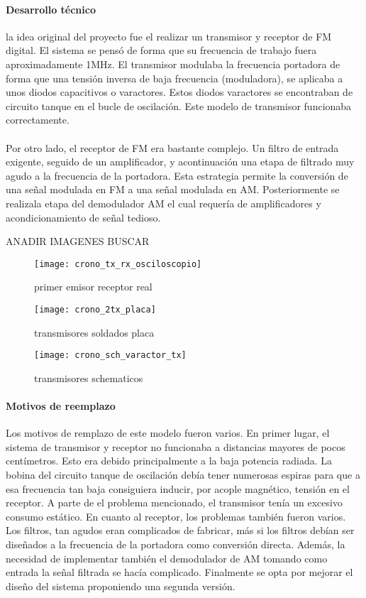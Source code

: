 \paragraph{Desarrollo técnico}
la idea original del proyecto fue el realizar un transmisor y receptor de FM digital. El sistema se pensó de forma que su frecuencia de trabajo fuera aproximadamente 1MHz. 
El transmisor modulaba la frecuencia portadora de forma que una tensión inversa de baja frecuencia (moduladora), se aplicaba a unos diodos capacitivos o varactores. Estos diodos varactores se encontraban de circuito tanque en el bucle de oscilación.
Este modelo de transmisor funcionaba correctamente.

\paragraph{}
Por otro lado, el receptor de FM era bastante complejo. Un filtro de entrada exigente, seguido de un amplificador, y acontinuación una etapa de filtrado muy agudo a la frecuencia de la portadora. Esta estrategia permite la conversión de una señal modulada en FM a una señal modulada en AM. Posteriormente se realizala etapa del demodulador AM el cual requería de amplificadores y acondicionamiento de señal tedioso.  

ANADIR IMAGENES BUSCAR
\begin{figure}[h]
    \centering
    \texttt{[image: crono\_tx\_rx\_osciloscopio]}
    \caption{primer emisor receptor real}
    \label{fig:simrx_zoom}
\end{figure}

\begin{figure}[h]
    \centering
    \texttt{[image: crono\_2tx\_placa]}
    \caption{transmisores soldados placa}
    \label{fig:simrx_zoom}
\end{figure}

\begin{figure}[h]
    \centering
    \texttt{[image: crono\_sch\_varactor\_tx]}
    \caption{transmisores schematicos} 
    \label{fig:simrx_zoom}
\end{figure}

\paragraph{Motivos de reemplazo}
Los motivos de remplazo de este modelo fueron varios.
En primer lugar, el sistema de transmisor y receptor no funcionaba a distancias mayores de pocos centímetros. Esto era debido principalmente a la baja potencia radiada. La bobina del circuito tanque de oscilación debía tener numerosas espiras para que a esa frecuencia tan baja consiguiera inducir, por acople magnético, tensión en el receptor.
A parte de el problema mencionado, el transmisor tenía un excesivo consumo estático. En cuanto al receptor, los problemas también fueron varios. Los filtros, tan agudos eran complicados de fabricar, más si los filtros debían ser diseñados a la frecuencia de la portadora como conversión directa. Además, la necesidad de implementar también el demodulador de AM tomando como entrada la señal filtrada se hacía complicado.
Finalmente se opta por mejorar el diseño del sistema proponiendo una segunda versión.
